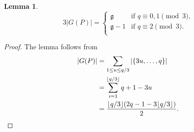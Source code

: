 \documentclass[a4paper]{amsart}
\theoremstyle{plain}
\newtheorem{lemma}[theorem]{Lemma}
\theoremstyle{definition}
\theoremstyle{remark}
\newcommand{\g}{\mathfrak{g}}
\begin{document}
\begin{lemma} \label{lm:GP-size}
\[3|G(P)| = \begin{cases}
\g & \text{if $q\equiv 0,1 \pmod3$,} \\
\g-1 & \text{if $q\equiv 2 \pmod3$.} \\
\end{cases}\]
\end{lemma}
\begin{proof}
The lemma follows from
\begin{align*}
|G(P)| &= \sum_{1 \leq u \leq q/3} |\{3u,\ldots,q\}| \\
&= \sum_{i=1}^{\lfloor q/3 \rfloor} q+1-3u \\
&= \frac{\lfloor q/3 \rfloor(2q-1-3\lfloor q/3 \rfloor)}{2}. \qedhere
\end{align*}
\end{proof}
\end{document}
